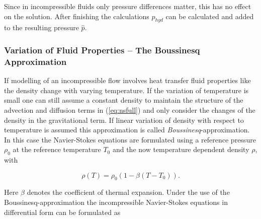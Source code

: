       Since in incompressible fluids only pressure differences matter, this has no effect on the solution. After finishing the calculations \(p_{hyd}\) can be calculated and added to the resulting pressure \(\hat{p}\).
     

      \subsubsection{Variation of Fluid Properties -- The Boussinesq Approximation}

      If modelling of an incompressible flow involves heat transfer fluid properties like the density change with varying temperature. If the variation of temperature is small one can still assume a constant density to maintain the structure of the advection and diffusion terms in (\ref{eq:nsfull}) and only consider the changes of the density in the gravitational term. If linear variation of density with respect to temperature is assumed this approximation is called \textit{Boussinesq}-approximation. In this case the Navier-Stokes equations are formulated using a reference pressure \(\rho_0\) at the reference temperature \(T_0\) and the now temperature dependent density \(\rho\), with

      \begin{equation}
        \rho \left( T \right) = \rho_0 \left( 1 - \beta \left( T - T_0 \right) \right).
      \end{equation}

      Here \(\beta\) denotes the coefficient of thermal expansion. Under the use of the Boussinesq-approximation the incompressible Navier-Stokes equations in differential form can be formulated as

